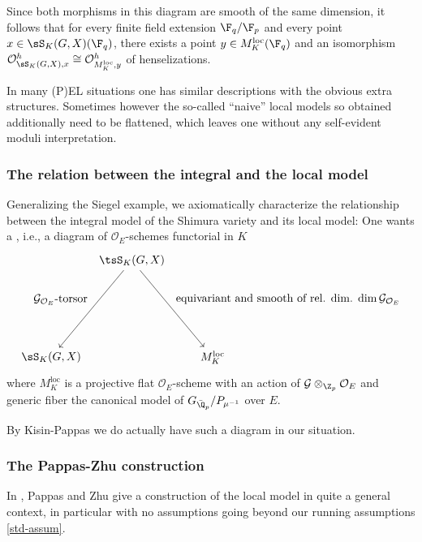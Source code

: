 \documentclass[a4paper]{scrartcl} %
\numberwithin{equation}{section}
\begin{document}
Since both morphisms in this diagram are smooth of the same dimension, it follows that for every finite field extension $\F_q/\F_p$ and every point $x\in\sS_K(G,X)(\F_q)$, there exists a point $y\in M^\mathrm{loc}_K(\F_q)$ and an isomorphism $\mathcal{O}_{\sS_K(G,X),x}^h\cong\mathcal{O}_{M^\mathrm{loc}_K,y}^h$ of henselizations.

In many (P)EL situations one has similar descriptions with the obvious extra structures. Sometimes however the so-called ``naive'' local models so obtained additionally need to be flattened, which leaves one without any self-evident moduli interpretation.


\subsubsection{The relation between the integral and the local model}
\label{sec:int-model-loc-model}

Generalizing the Siegel example, we axiomatically characterize the relationship between the integral model of the Shimura variety and its local model: One wants a , i.e., a diagram of $\mathcal{O}_E$-schemes functorial in $K$
\begin{equation}\label{eq:loc-mod-diagr}
  \begin{tikzpicture}[node distance=4cm, auto]
    \node (X) at (2.5,3) {$\tsS_K(G,X)$};
    \node (Z) at (0,0) {$\sS_K(G,X)$};
    \node (Xs) at (5,0) {$M^\mathrm{loc}_K$};
    
    \draw[->] (X) to node {equivariant and smooth of rel. dim. $\dim \mathcal{G}_{\mathcal{O}_E}$} (Xs);
    \draw[->] (X) to node[swap] {$\mathcal{G}_{\mathcal{O}_E}$-torsor} (Z);
  \end{tikzpicture}
\end{equation}
where $M^\mathrm{loc}_K$ is a projective flat $\mathcal{O}_E$-scheme with an action of $\mathcal{G}\otimes_{\Z_p}\mathcal{O}_E$ and generic fiber the canonical model of $G_{\bar\Q_p}/P_{\mu^{-1}}$ over $E$.

By Kisin-Pappas \cite{kisin-pappas} we do actually have such a diagram in our situation.


\subsubsection{The Pappas-Zhu construction}
\label{sec:papp-zhu-constr}

In \cite{pappas-zhu}, Pappas and Zhu give a construction of the local model in quite a general context, in particular with no assumptions going beyond our running assumptions \ref{std-assum}.
\end{document}
